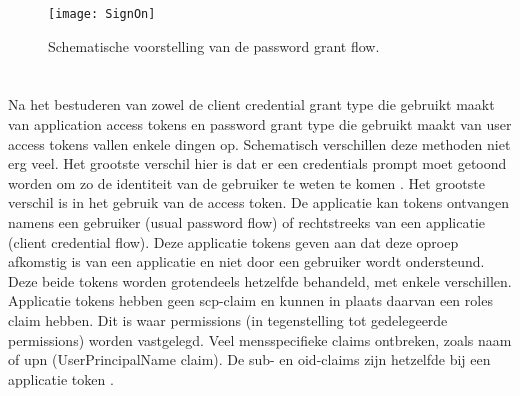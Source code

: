 \begin{figure}[H]
	\centering
	\texttt{[image: SignOn]} 
	\caption[SignOn]{Schematische voorstelling van de password grant flow.}
	\label{fig:signOn}
	\scriptsize
	\cite{jmprieur2019}
\end{figure}
\section{}
\label{sec:comparePoc}
Na het bestuderen van zowel de client credential grant type die gebruikt maakt van application access tokens en password grant type die gebruikt maakt van user access tokens vallen enkele dingen op. Schematisch verschillen deze methoden niet erg veel. Het grootste verschil hier is dat er een credentials prompt moet getoond worden om zo de identiteit van de gebruiker te weten te komen \autocite{hpsin2020}. \newline
Het grootste verschil is in het gebruik van de access token. De applicatie kan tokens ontvangen namens een gebruiker (usual password flow) of rechtstreeks van een applicatie (client credential flow). Deze applicatie tokens geven aan dat deze oproep afkomstig is van een applicatie en niet door een gebruiker wordt ondersteund. Deze beide tokens worden grotendeels hetzelfde behandeld, met enkele verschillen. Applicatie tokens hebben geen scp-claim en kunnen in plaats daarvan een roles claim hebben. Dit is waar permissions (in tegenstelling tot gedelegeerde permissions) worden vastgelegd. Veel mensspecifieke claims ontbreken, zoals naam of upn (UserPrincipalName claim). De sub- en oid-claims zijn hetzelfde bij een applicatie token \autocite{hpsin2020}.